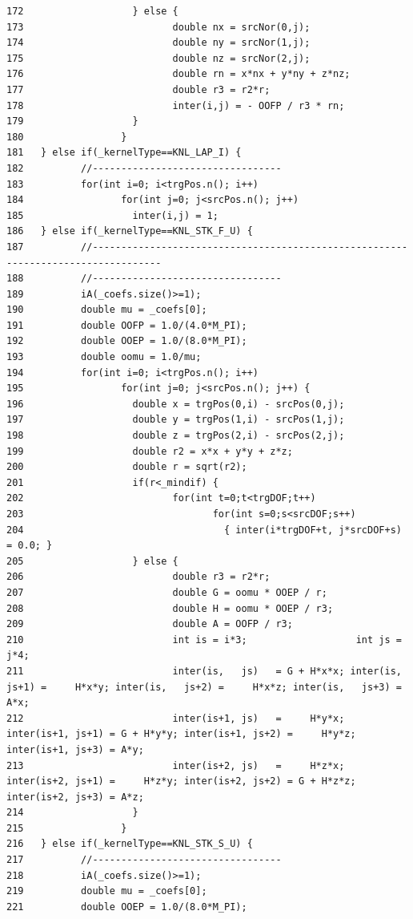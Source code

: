 \begin{verbatim}
172                   } else {
173                          double nx = srcNor(0,j);
174                          double ny = srcNor(1,j);
175                          double nz = srcNor(2,j);
176                          double rn = x*nx + y*ny + z*nz;
177                          double r3 = r2*r;
178                          inter(i,j) = - OOFP / r3 * rn;
179                   }
180                 }
181   } else if(_kernelType==KNL_LAP_I) {
182          //---------------------------------
183          for(int i=0; i<trgPos.n(); i++)
184                 for(int j=0; j<srcPos.n(); j++)
185                   inter(i,j) = 1;
186   } else if(_kernelType==KNL_STK_F_U) {
187          //----------------------------------------------------------------------------------
188          //---------------------------------
189          iA(_coefs.size()>=1);
190          double mu = _coefs[0];
191          double OOFP = 1.0/(4.0*M_PI);
192          double OOEP = 1.0/(8.0*M_PI);
193          double oomu = 1.0/mu;
194          for(int i=0; i<trgPos.n(); i++)
195                 for(int j=0; j<srcPos.n(); j++) {
196                   double x = trgPos(0,i) - srcPos(0,j);
197                   double y = trgPos(1,i) - srcPos(1,j);
198                   double z = trgPos(2,i) - srcPos(2,j);
199                   double r2 = x*x + y*y + z*z;
200                   double r = sqrt(r2);
201                   if(r<_mindif) {
202                          for(int t=0;t<trgDOF;t++)
203                                 for(int s=0;s<srcDOF;s++)
204                                   { inter(i*trgDOF+t, j*srcDOF+s) = 0.0; }
205                   } else {
206                          double r3 = r2*r;
207                          double G = oomu * OOEP / r;
208                          double H = oomu * OOEP / r3;
209                          double A = OOFP / r3;
210                          int is = i*3;                   int js = j*4;
211                          inter(is,   js)   = G + H*x*x; inter(is,   js+1) =     H*x*y; inter(is,   js+2) =     H*x*z; inter(is,   js+3) = A*x;
212                          inter(is+1, js)   =     H*y*x; inter(is+1, js+1) = G + H*y*y; inter(is+1, js+2) =     H*y*z; inter(is+1, js+3) = A*y;
213                          inter(is+2, js)   =     H*z*x; inter(is+2, js+1) =     H*z*y; inter(is+2, js+2) = G + H*z*z; inter(is+2, js+3) = A*z;
214                   }
215                 }
216   } else if(_kernelType==KNL_STK_S_U) {
217          //---------------------------------
218          iA(_coefs.size()>=1);
219          double mu = _coefs[0];
221          double OOEP = 1.0/(8.0*M_PI);

\end{verbatim}
